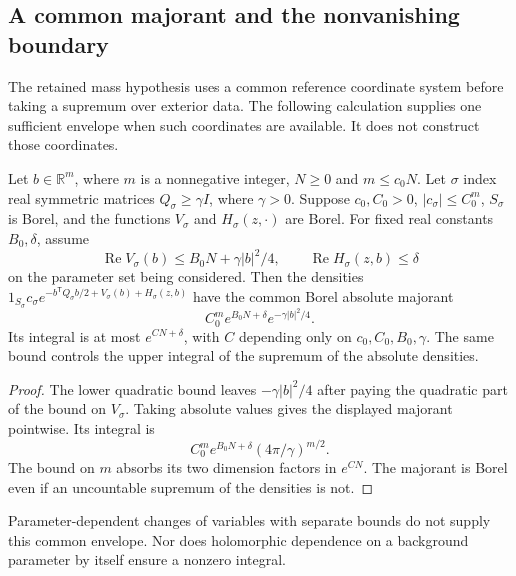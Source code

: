 \documentclass[11pt,letterpaper,reqno]{amsart}
\makeatletter
\numberwithin{equation}{section}
\theoremstyle{definition}
\newcommand{\ms@minorstart}{%
  \pushQED{\qed}\renewcommand{\qedsymbol}{$\blacksquare$}}
\newenvironment{lemma}[1][]{\ms@minorstart\ms@lemma[#1]}
  {\popQED\endms@lemma}
\theoremstyle{remark}
\makeatother
\begin{document}
\subsection{A common majorant and the nonvanishing boundary}
\label{si:subsec-retained-boundaries}

The retained mass hypothesis uses a common reference coordinate
system before taking a supremum over exterior data. The following
calculation supplies one sufficient envelope when such coordinates
are available. It does not construct those coordinates.

\begin{samepage}
\begin{lemma}[A common Gaussian majorant]
\label{si:lem-common-gaussian}
Let $b\in\mathbb R^m$, where $m$ is a nonnegative integer,
$N\ge0$ and $m\le c_0N$. Let $\sigma$ index
real symmetric matrices $Q_\sigma\ge\gamma I$, where $\gamma>0$.
Suppose $c_0,C_0>0$, $|c_\sigma|\le C_0^m$, $S_\sigma$ is Borel,
and the functions $V_\sigma$ and $H_\sigma(z,\cdot)$ are Borel.
For fixed real constants $B_0,\delta$, assume
\[
 \operatorname{Re}V_\sigma(b)\le B_0N+\gamma|b|^2/4,
 \qquad \operatorname{Re}H_\sigma(z,b)\le\delta
\]
on the parameter set being considered. Then the densities
$1_{S_\sigma}c_\sigma
 e^{-b^{\mathsf T}Q_\sigma b/2+V_\sigma(b)+H_\sigma(z,b)}$
have the common Borel absolute majorant
\[
 C_0^m e^{B_0N+\delta}e^{-\gamma|b|^2/4}.
\]
Its integral is at most $e^{CN+\delta}$, with $C$ depending only
on $c_0,C_0,B_0,\gamma$. The same bound controls the upper integral
of the supremum of the absolute densities.
\end{lemma}
\end{samepage}
\begin{proof}
The lower quadratic bound leaves $-\gamma|b|^2/4$ after paying
the quadratic part of the bound on $V_\sigma$. Taking absolute
values gives the displayed majorant pointwise. Its integral is
\[
 C_0^m e^{B_0N+\delta}(4\pi/\gamma)^{m/2}.
\]
The bound on $m$
absorbs its two dimension factors in $e^{CN}$. The majorant is
Borel even if an uncountable supremum of the densities is not.
\end{proof}

Parameter-dependent changes of variables with separate bounds do
not supply this common envelope. Nor does holomorphic dependence
on a background parameter by itself ensure a nonzero integral.
\end{document}
